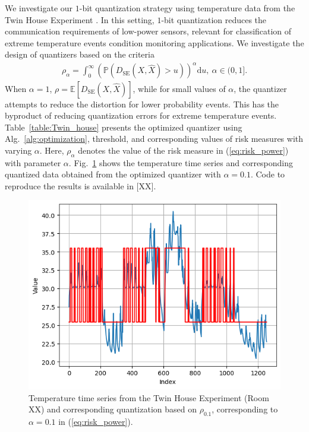 \documentclass[conference]{IEEEtran}
\begin{document}
We investigate our $1$-bit quantization strategy using temperature data from the Twin House Experiment \cite{Kersken2020}. In this setting, $1$-bit quantization reduces the communication requirements of low-power sensors, relevant for classification of extreme temperature events condition monitoring applications. We investigate the design of quantizers based on the criteria 
\begin{align}\label{eq:risk_power}
	\rho_{\alpha} = \int_0^{\infty} \left(\mathbb{P}(D_{\mathrm{SE}}(X,\hat{X}) > u)\right)^{\alpha}\mathrm{d}u,~\alpha \in (0,1].
\end{align} 
When $\alpha = 1$, $\rho = \mathbb{E}[D_{\mathrm{SE}}(X,\hat{X})]$, while for small values of $\alpha$, the quantizer attempts to reduce the distortion for lower probability events. This has the byproduct of reducing quantization errors for extreme temperature events. Table~\ref{table:Twin_house} presents the optimized quantizer using Alg.~\ref{alg:optimization}, threshold, and corresponding values of risk measures with varying $\alpha$. Here, $\rho_{\alpha}$ denotes the value of the risk measure in (\ref{eq:risk_power}) with parameter $\alpha$. Fig.~\ref{fig:time_series} shows the temperature time series and corresponding quantized data obtained from the optimized quantizer with $\alpha = 0.1$. Code to reproduce the results is available in [XX].  

\begin{figure}
	\centering
	\includegraphics[width=\linewidth]{time_series.png}%
	\caption{Temperature time series from the Twin House Experiment \cite{Kersken2020} (Room XX) and corresponding quantization based on $\rho_{0.1}$, corresponding to $\alpha = 0.1$ in (\ref{eq:risk_power}).}
	\label{fig:time_series}
\end{figure}
\end{document}
